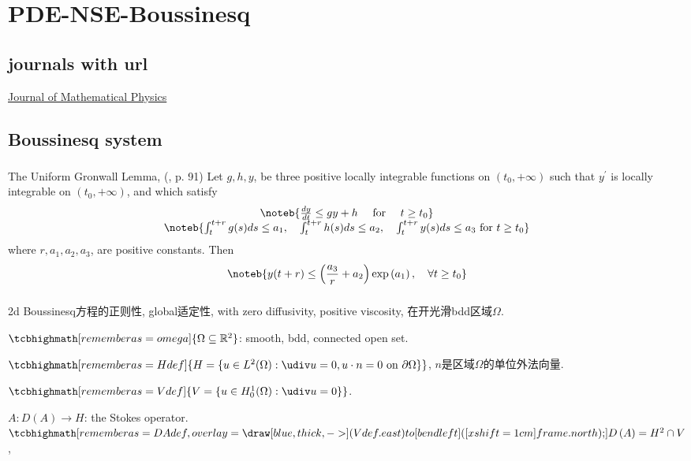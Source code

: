\chapter{PDE-NSE-Boussinesq}
\section{journals with url}
\href{https://aip.scitation.org/journal/jmp}{Journal of Mathematical Physics}

\section{Boussinesq system}
\subsection{\cite{T}}
\begin{theorem}{The Uniform Gronwall Lemma, (\cite{T}, p. 91)}{}
	Let $g, h, y$, be three positive locally integrable functions on $(t_{0},+\infty)$ 
	such that $y^{\prime}$ is locally integrable on $(t_{0},+\infty)$, 
	and which satisfy
	$$
	\begin{array}{c}
		\noteb{\frac{d y}{d t} \leq g y+h \quad \text { for } \quad t \geq t_{0}} \\
		\noteb{\int_{t}^{t+r} g(s) d s \leq a_{1}, \quad \int_{t}^{t+r} h(s) d s \leq a_{2}, \quad \int_{t}^{t+r} y(s) d s \leq a_{3} \text { for } t \geq t_{0}}
	\end{array}
	$$
	where $r, a_{1}, a_{2}, a_{3}$, are positive constants. Then
	$$
	\noteb{y(t+r) \leq\left(\frac{a_{3}}{r}+a_{2}\right) \exp \left(a_{1}\right), \quad \forall t \geq t_{0}}
	$$
\end{theorem}


\subsection{\cite{HKZ}}
2d Boussinesq方程的正则性, global适定性, with zero diffusivity, positive viscosity, 在开光滑bdd区域$\Omega$. 


$\tcbhighmath[remember as=omega]{\Omega\subseteq\RR^2}$: smooth, bdd, connected open set.

$\tcbhighmath[remember as=Hdef]{H=\{u\in L^2(\Omega): \udiv u = 0, u\cdot n=0 \text{ on } \partial\Omega\}}$, $n$是区域$\Omega$的单位外法向量.

$\tcbhighmath[remember as=Vdef]{V=\{u\in H_0^1(\Omega): \udiv u = 0\}}$.

$A:D\left(A\right)\to H$: the Stokes operator. 
$\tcbhighmath[remember as=DAdef,overlay={\draw[blue, thick, ->] (Vdef.east) to[bend left] ([xshift=1cm]frame.north);}]{D\left(A\right)=H^{2}\cap V}$,

